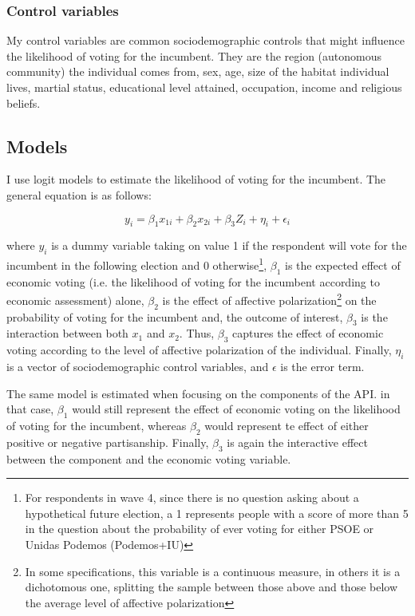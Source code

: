 \documentclass[a4paper, svgnames]{article}
\begin{document}
\subsubsection{Control variables}
My control variables are common sociodemographic controls that might influence the likelihood of voting for the incumbent. They are the region (autonomous community) the individual comes from, sex, age, size of the habitat individual lives, martial status, educational level attained, occupation, income and religious beliefs.


\subsection{Models}

I use logit models to estimate the likelihood of voting for the incumbent. The general equation is as follows:

\begin{equation}
	\label{model}
	y_i = \beta_1 x_{1i} + \beta_2 x_{2i} + \beta_3 Z_i  + \eta_i  + \epsilon_i
\end{equation}

where $y_i$ is a dummy variable taking on value 1 if the respondent will vote for the incumbent in the following election and 0 otherwise\footnote{For respondents in wave 4, since there is no question asking about a hypothetical future election, a 1 represents people with a score of more than 5 in the question about the probability of ever voting for either PSOE or Unidas Podemos (Podemos+IU)}, $\beta_1$ is the expected effect of economic voting (i.e. the likelihood of voting for the incumbent according to economic assessment) alone, $\beta_2$ is the effect of affective polarization\footnote{In some specifications, this variable is a continuous measure, in others it is a dichotomous one, splitting the sample between those above and those below the average level of affective polarization} on the probability of voting for the incumbent and, the outcome of interest, $\beta_3$ is the interaction between both $x_1$ and $x_2$. Thus, $\beta_3$ captures the effect of economic voting according to the level of affective polarization of the individual. Finally, $\eta_i$ is a vector of sociodemographic control variables, and $\epsilon$ is the error term.

The same model is estimated when focusing on the components of the API. in that case, $\beta_1$ would still represent the effect of economic voting on the likelihood of voting for the incumbent, whereas $\beta_2$ would represent te effect of either positive or negative partisanship. Finally, $\beta_3$ is again the interactive effect between the component and the economic voting variable.
\end{document}
